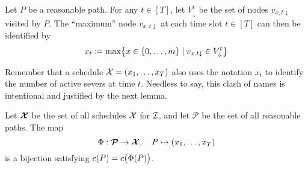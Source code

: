 \begin{defn}
Let $P$ be a reasonable path. For any $t\in[T]$, let $V_\downarrow^t$ be the set of nodes $v_{x,t\downarrow}$ visited by $P$. The ``maximum'' node $v_{x,t\downarrow}$ at each time slot $t\in[T]$ can then be identified by
\begin{equation*}
	x_t\coloneqq\max\bigl\{x\in\{0,\ldots,m\}\mid v_{x,t\downarrow}\in V_\downarrow^t\bigr\}
\end{equation*}
\end{defn}
Remember that a schedule $\mathcal{X}=(x_1,\ldots,x_T)$ also uses the notation $x_t$ to identify the number of active severs at time $t$. Needless to say, this clash of names is intentional and justified by the next lemma.
\begin{lem}\label{lem:sched_reasn_path_pseudo_lin}
Let $\bm{\mathcal{X}}$ be the set of all schedules $\mathcal{X}$ for $\mathcal{I}$, and let $\bm{\mathcal{P}}$ be the set of all reasonable paths. The map
\begin{equation*}\label{prop:reasn_paths_identify}
	\Phi:\bm{\mathcal{P}}\rightarrow\bm{\mathcal{X}},\quad P\mapsto (x_1,\ldots,x_T)
\end{equation*}
is a bijection satisfying $c(P)=c\bigl(\Phi(P)\bigr)$.
\end{lem}

